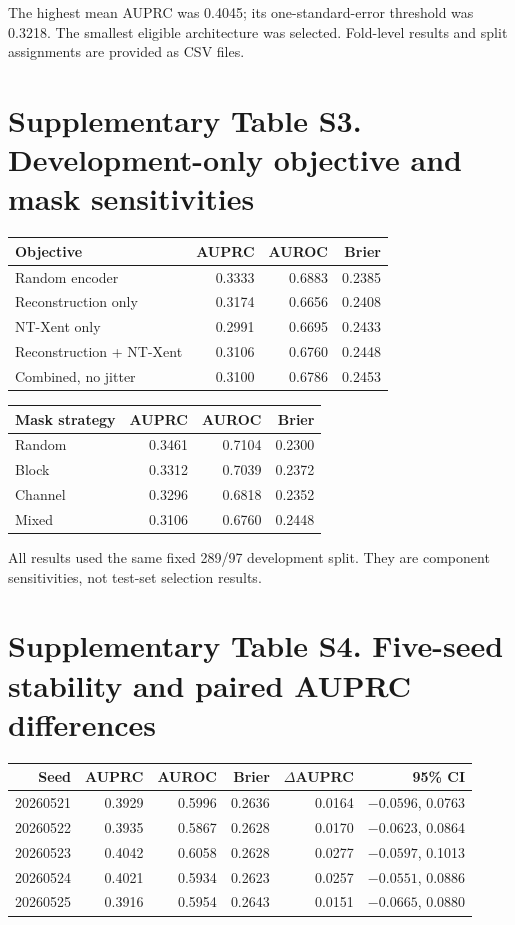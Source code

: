 \documentclass[11pt]{article}
\begin{document}
The highest mean AUPRC was 0.4045; its one-standard-error threshold was 0.3218. The smallest eligible architecture was selected. Fold-level results and split assignments are provided as CSV files.

\section*{Supplementary Table S3. Development-only objective and mask sensitivities}
\begin{tabular}{lrrr}
\toprule
Objective & AUPRC & AUROC & Brier \\
\midrule
Random encoder & 0.3333 & 0.6883 & 0.2385 \\
Reconstruction only & 0.3174 & 0.6656 & 0.2408 \\
NT-Xent only & 0.2991 & 0.6695 & 0.2433 \\
Reconstruction + NT-Xent & 0.3106 & 0.6760 & 0.2448 \\
Combined, no jitter & 0.3100 & 0.6786 & 0.2453 \\
\bottomrule
\end{tabular}

\vspace{8pt}
\begin{tabular}{lrrr}
\toprule
Mask strategy & AUPRC & AUROC & Brier \\
\midrule
Random & 0.3461 & 0.7104 & 0.2300 \\
Block & 0.3312 & 0.7039 & 0.2372 \\
Channel & 0.3296 & 0.6818 & 0.2352 \\
Mixed & 0.3106 & 0.6760 & 0.2448 \\
\bottomrule
\end{tabular}

All results used the same fixed 289/97 development split. They are component sensitivities, not test-set selection results.

\section*{Supplementary Table S4. Five-seed stability and paired AUPRC differences}
\begin{tabular}{rrrrrr}
\toprule
Seed & AUPRC & AUROC & Brier & $\Delta$AUPRC & 95\% CI \\
\midrule
20260521 & 0.3929 & 0.5996 & 0.2636 & 0.0164 & $-0.0596$, 0.0763 \\
20260522 & 0.3935 & 0.5867 & 0.2628 & 0.0170 & $-0.0623$, 0.0864 \\
20260523 & 0.4042 & 0.6058 & 0.2628 & 0.0277 & $-0.0597$, 0.1013 \\
20260524 & 0.4021 & 0.5934 & 0.2623 & 0.0257 & $-0.0551$, 0.0886 \\
20260525 & 0.3916 & 0.5954 & 0.2643 & 0.0151 & $-0.0665$, 0.0880 \\
\bottomrule
\end{tabular}
\end{document}
